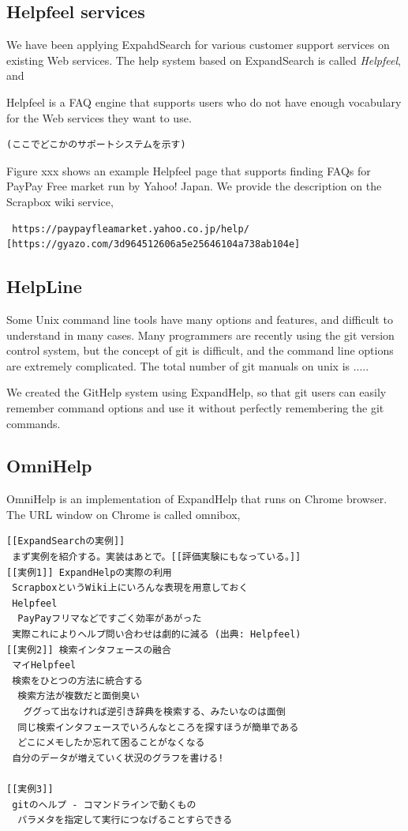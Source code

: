 \documentclass[manuscript,screen,review]{acmart}
\begin{document}
\subsection{Helpfeel services}

We have been applying ExpahdSearch for various customer support services on existing Web services.
The help system based on ExpandSearch is called \textit{Helpfeel}, and

Helpfeel is a FAQ engine that supports users who do not have enough vocabulary for the Web services they want to use.

\begin{verbatim}
(ここでどこかのサポートシステムを示す)
\end{verbatim}

Figure xxx shows an example Helpfeel page that supports finding FAQs
for PayPay Free market run by Yahoo! Japan.
We provide the description on the Scrapbox wiki service,

\begin{verbatim}
 https://paypayfleamarket.yahoo.co.jp/help/
[https://gyazo.com/3d964512606a5e25646104a738ab104e]
\end{verbatim}

\subsection{HelpLine}

Some Unix command line tools have many options and features, and difficult to understand in many cases.
Many programmers are recently using the git version control system, but the concept of git is difficult, and
the command line options are extremely complicated.
The total number of git manuals on unix is .....

We created the GitHelp system using ExpandHelp, so that git users can easily
remember command options and use it without perfectly remembering the git commands.

\subsection{OmniHelp}

OmniHelp is an implementation of ExpandHelp that runs on Chrome browser.
The URL window on Chrome is called omnibox, 

\begin{verbatim}
[[ExpandSearchの実例]]
 まず実例を紹介する。実装はあとで。[[評価実験にもなっている。]]
[[実例1]] ExpandHelpの実際の利用
 ScrapboxというWiki上にいろんな表現を用意しておく
 Helpfeel
  PayPayフリマなどですごく効率があがった
 実際これによりヘルプ問い合わせは劇的に減る (出典: Helpfeel)
[[実例2]] 検索インタフェースの融合
 マイHelpfeel
 検索をひとつの方法に統合する
  検索方法が複数だと面倒臭い
   ググって出なければ逆引き辞典を検索する、みたいなのは面倒
  同じ検索インタフェースでいろんなところを探すほうが簡単である
  どこにメモしたか忘れて困ることがなくなる
 自分のデータが増えていく状況のグラフを書ける!

[[実例3]]
 gitのヘルプ - コマンドラインで動くもの
  パラメタを指定して実行につなげることすらできる
\end{verbatim}
\end{document}
